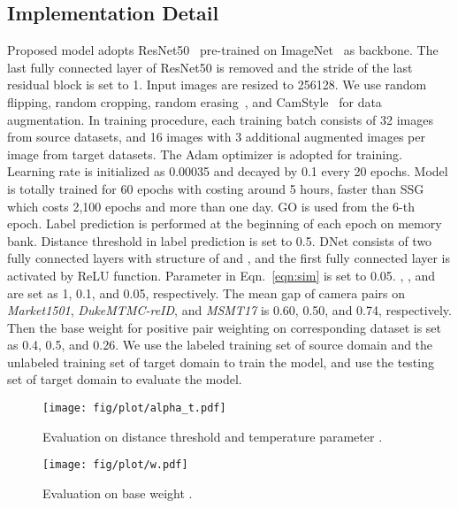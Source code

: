 \documentclass[sigconf]{acmart}
\begin{document}
\subsection{Implementation Detail}
Proposed model adopts ResNet50~\cite{resnet} pre-trained on ImageNet~\cite{imagenet} as backbone. The last fully connected layer of ResNet50 is removed and the stride of the last residual block is set to 1. Input images are resized to 256128. We use random flipping, random cropping, random erasing~\cite{zhong2017random}, and CamStyle~\cite{zhong2018camera} for data augmentation.
In training procedure, each training batch consists of 32 images from source datasets, and 16 images with 3 additional augmented images per image from target datasets. The Adam optimizer is adopted for training. Learning rate is initialized as 0.00035 and decayed by 0.1 every 20 epochs. Model is totally trained for 60 epochs with costing around 5 hours, faster than SSG~\cite{ssg} which costs 2,100 epochs and more than one day. GO is used from the 6-th epoch. Label prediction is performed at the beginning of each epoch on memory bank. Distance threshold  in label prediction is set to 0.5. DNet consists of two fully connected layers with structure of  and , and the first fully connected layer is activated by ReLU function. Parameter  in Eqn.~\eqref{eqn:sim} is set to 0.05. , , and  are set as 1, 0.1, and 0.05, respectively. The mean gap of camera pairs on \textit{Market1501}, \textit{DukeMTMC-reID}, and \textit{MSMT17} is 0.60, 0.50, and 0.74, respectively. Then the base weight  for positive pair weighting on corresponding dataset is set as 0.4, 0.5, and 0.26. We use the labeled training set of source domain and the unlabeled training set of target domain to train the model, and use the testing set of target domain to evaluate the model. 


\begin{figure}[t]
\begin{center}
\texttt{[image: fig/plot/alpha\_t.pdf]}
\end{center}
\vspace{-5mm}
\caption{Evaluation on distance threshold  and temperature parameter .}
\label{fig:alpha_t}
\vspace{-4mm}
\end{figure}


\begin{figure}[t]
\begin{center}
\texttt{[image: fig/plot/w.pdf]}
\end{center}
\vspace{-5mm}
\caption{Evaluation on base weight .}
\label{fig:w}
\vspace{-4mm}
\end{figure}
\end{document}
